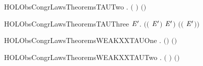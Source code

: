 \newcommand{\HOLObsCongrLawsTheoremsTAUOne}{\UseVerbatim{HOLObsCongrLawsTheoremsTAUOne}}
\begin{SaveVerbatim}{HOLObsCongrLawsTheoremsTAUTwo}
\HOLTokenTurnstile{} \HOLSymConst{\HOLTokenForall{}}.  \ensuremath{(} \HOLSymConst{\ensuremath{+}} \HOLConst{\ensuremath{\tau}}\HOLSymConst{\ensuremath{\ldotp}}\ensuremath{)} \ensuremath{(}\HOLConst{\ensuremath{\tau}}\HOLSymConst{\ensuremath{\ldotp}}\ensuremath{)}
\end{SaveVerbatim}
\newcommand{\HOLObsCongrLawsTheoremsTAUTwo}{\UseVerbatim{HOLObsCongrLawsTheoremsTAUTwo}}
\begin{SaveVerbatim}{HOLObsCongrLawsTheoremsTAUThree}
\HOLTokenTurnstile{} \HOLSymConst{\HOLTokenForall{}}  \ensuremath{\HOLBoundVar{E}\sp{\prime}}.  \ensuremath{(}\HOLSymConst{\ensuremath{\ldotp}}\ensuremath{(} \HOLSymConst{\ensuremath{+}} \HOLConst{\ensuremath{\tau}}\HOLSymConst{\ensuremath{\ldotp}}\ensuremath{\HOLBoundVar{E}\sp{\prime}}\ensuremath{)} \HOLSymConst{\ensuremath{+}} \HOLSymConst{\ensuremath{\ldotp}}\ensuremath{\HOLBoundVar{E}\sp{\prime}}\ensuremath{)} \ensuremath{(}\HOLSymConst{\ensuremath{\ldotp}}\ensuremath{(} \HOLSymConst{\ensuremath{+}} \HOLConst{\ensuremath{\tau}}\HOLSymConst{\ensuremath{\ldotp}}\ensuremath{\HOLBoundVar{E}\sp{\prime}}\ensuremath{)}\ensuremath{)}
\end{SaveVerbatim}
\newcommand{\HOLObsCongrLawsTheoremsTAUThree}{\UseVerbatim{HOLObsCongrLawsTheoremsTAUThree}}
\begin{SaveVerbatim}{HOLObsCongrLawsTheoremsWEAKXXTAUOne}
\HOLTokenTurnstile{} \HOLSymConst{\HOLTokenForall{}} .  \ensuremath{(}\HOLSymConst{\ensuremath{\ldotp}}\HOLConst{\ensuremath{\tau}}\HOLSymConst{\ensuremath{\ldotp}}\ensuremath{)} \ensuremath{(}\HOLSymConst{\ensuremath{\ldotp}}\ensuremath{)}
\end{SaveVerbatim}
\newcommand{\HOLObsCongrLawsTheoremsWEAKXXTAUOne}{\UseVerbatim{HOLObsCongrLawsTheoremsWEAKXXTAUOne}}
\begin{SaveVerbatim}{HOLObsCongrLawsTheoremsWEAKXXTAUTwo}
\HOLTokenTurnstile{} \HOLSymConst{\HOLTokenForall{}}.  \ensuremath{(} \HOLSymConst{\ensuremath{+}} \HOLConst{\ensuremath{\tau}}\HOLSymConst{\ensuremath{\ldotp}}\ensuremath{)} \ensuremath{(}\HOLConst{\ensuremath{\tau}}\HOLSymConst{\ensuremath{\ldotp}}\ensuremath{)}
\end{SaveVerbatim}
